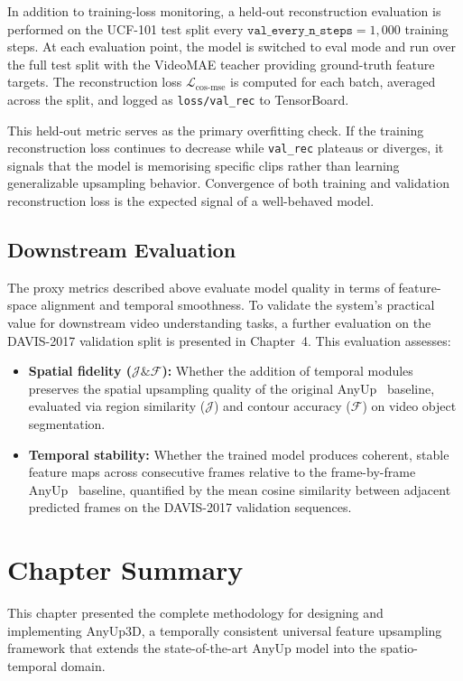 In addition to training-loss monitoring, a held-out reconstruction evaluation is performed
on the UCF-101 test split every $\texttt{val\_every\_n\_steps} = 1{,}000$ training steps.
At each evaluation point, the model is switched to eval mode and run over the full test
split with the VideoMAE teacher providing ground-truth feature targets. The reconstruction
loss $\mathcal{L}_{\mathrm{cos\text{-}mse}}$ is computed for each batch, averaged across
the split, and logged as \texttt{loss/val\_rec} to TensorBoard.

This held-out metric serves as the primary overfitting check. If the training
reconstruction loss continues to decrease while \texttt{val\_rec} plateaus or diverges,
it signals that the model is memorising specific clips rather than learning generalizable
upsampling behavior. Convergence of both training and validation reconstruction loss
is the expected signal of a well-behaved model.

\subsection{Downstream Evaluation}

The proxy metrics described above evaluate model quality in terms of feature-space
alignment and temporal smoothness. To validate the system's practical value for
downstream video understanding tasks, a further evaluation on the DAVIS-2017
validation split is presented in Chapter~4. This evaluation assesses:

\begin{itemize}
    \item \textbf{Spatial fidelity ($\mathcal{J}\&\mathcal{F}$):} Whether the addition
    of temporal modules preserves the spatial upsampling quality of the original AnyUp~\cite{anyup}
    baseline, evaluated via region similarity ($\mathcal{J}$) and contour accuracy
    ($\mathcal{F}$) on video object segmentation.
    \item \textbf{Temporal stability:} Whether the trained model produces coherent,
    stable feature maps across consecutive frames relative to the frame-by-frame
    AnyUp~\cite{anyup} baseline, quantified by the mean cosine similarity between adjacent
    predicted frames on the DAVIS-2017 validation sequences.
\end{itemize}

\section{Chapter Summary}
This chapter presented the complete methodology for designing and implementing AnyUp3D, a temporally consistent universal feature upsampling framework that extends the state-of-the-art AnyUp model into the spatio-temporal domain.

